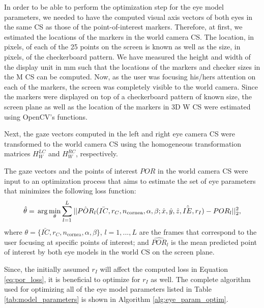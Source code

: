 \documentclass{article}
\begin{document}
In order to be able to perform the optimization step for the eye model parameters, we needed to have the computed visual axis vectors of both eyes in the same CS as those of the point-of-interest markers. Therefore, at first, we estimated the locations of the markers in the world camera CS. The location, in pixels, of each of the 25 points on the screen is known as well as the size, in pixels, of the checkerboard pattern. We have measured the height and width of the display unit in mm such that the locations of the markers and checker sizes in the M CS can be computed.  Now, as the user was focusing his/hers attention on each of the markers, the screen was completely visible to the world camera.  Since the markers were displayed on top of a checkerboard pattern of known size, the screen plane as well as the location of the markers in 3D W CS were estimated using OpenCV's functions.

Next, the gaze vectors computed in the left and right eye camera CS were transformed to the world camera CS using the homogeneous transformation matrices $H^{LC}_W$ and $H^{RC}_W$, respectively.

The gaze vectors and the points of interest $POR$ in the world camera CS were input to an optimization process that aims to estimate the set of eye parameters that minimizes the following loss function:
\begin{equation} \label{eq:por_loss}
\hat{\theta} = \\
\arg \min_{\theta} \sum_{l=1}^{L} ||\hat{POR}_l(\bar{IC}, r_C, n_{\text{cornea}}, \alpha, \beta; \hat{x}, \hat{y}, \hat{z}, \hat{\bar{IE}}, r_I) - POR_l||_2^2,
\end{equation}
where $\theta = \{\bar{IC}, r_C, n_{\text{cornea}}, \alpha, \beta \}$, $l=1,...,L$ are the frames that correspond to the user focusing at specific points of interest; and $\hat{POR}_l$ is the mean predicted point of interest by both eye models in the world CS on the screen plane.  

Since, the initially assumed $r_I$ will affect the computed loss in Equation \ref{eq:por_loss}, it is beneficial to optimize for $r_I$ as well. The complete algorithm used for optimizing all of the eye model parameters listed in Table \ref{tab:model_parameters} is shown in Algorithm \ref{alg:eye_param_optim}.
\end{document}
